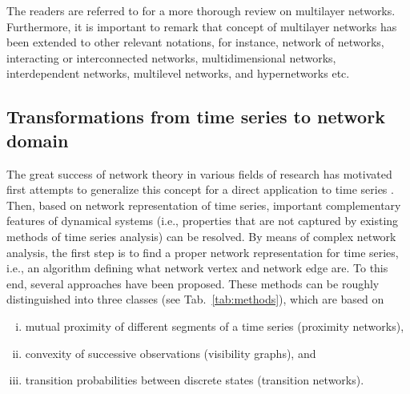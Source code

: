 		The readers are referred to \cite{Boccaletti2014,Buldyrev2010} for a more thorough review on multilayer networks. Furthermore, it is important to remark that concept of multilayer networks has been extended to other relevant notations, for instance, network of networks, interacting or interconnected networks, multidimensional networks, interdependent networks, multilevel networks, and hypernetworks etc. 
		
		\subsection{Transformations from time series to network domain}
		The great success of network theory in various fields of research has motivated first attempts to generalize this concept for a direct application to time series \cite{Zhang2006,Zhang2008,Xu2008,Shimada2008,Yang2008,Lacasa2008,Wu2008,Small2009,Gao2009,Marwan2009,Donner2010a,Donner2011}. Then, based on network representation of time series, important complementary features of dynamical systems (i.e., properties that are not captured by existing methods of time series analysis) can be resolved. By means of complex network analysis, the first step is to find a proper network representation for time series, i.e., an algorithm defining what network vertex and network edge are. To this end, several approaches have been proposed. These methods can be roughly distinguished into three classes (see Tab.~\ref{tab:methods}), which are based on
\begin{enumerate}[(i)]
\item mutual proximity of different segments of a time series (proximity networks),
\item convexity of successive observations (visibility graphs), and
\item transition probabilities between discrete states (transition networks).
\end{enumerate}

